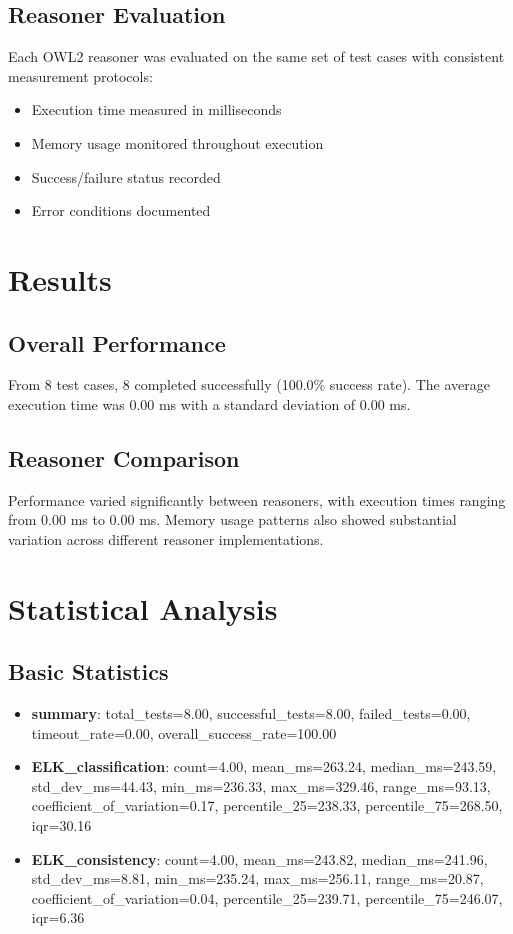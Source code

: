 \documentclass[11pt,a4paper]{{article}}
\begin{document}
\subsection{Reasoner Evaluation}
Each OWL2 reasoner was evaluated on the same set of test cases with consistent measurement protocols:
\begin{itemize}
    \item Execution time measured in milliseconds
    \item Memory usage monitored throughout execution
    \item Success/failure status recorded
    \item Error conditions documented
\end{itemize}


\section{Results}

\subsection{Overall Performance}
From 8 test cases, 8 completed successfully (100.0\% success rate). The average execution time was 0.00 ms with a standard deviation of 0.00 ms.

\subsection{Reasoner Comparison}
Performance varied significantly between reasoners, with execution times ranging from 0.00 ms to 0.00 ms. Memory usage patterns also showed substantial variation across different reasoner implementations.


\section{Statistical Analysis}

\subsection{Basic Statistics}
\begin{itemize}
    \item \textbf{summary}: total_tests=8.00, successful_tests=8.00, failed_tests=0.00, timeout_rate=0.00, overall_success_rate=100.00
    \item \textbf{ELK_classification}: count=4.00, mean_ms=263.24, median_ms=243.59, std_dev_ms=44.43, min_ms=236.33, max_ms=329.46, range_ms=93.13, coefficient_of_variation=0.17, percentile_25=238.33, percentile_75=268.50, iqr=30.16
    \item \textbf{ELK_consistency}: count=4.00, mean_ms=243.82, median_ms=241.96, std_dev_ms=8.81, min_ms=235.24, max_ms=256.11, range_ms=20.87, coefficient_of_variation=0.04, percentile_25=239.71, percentile_75=246.07, iqr=6.36
\end{itemize}
\end{document}
